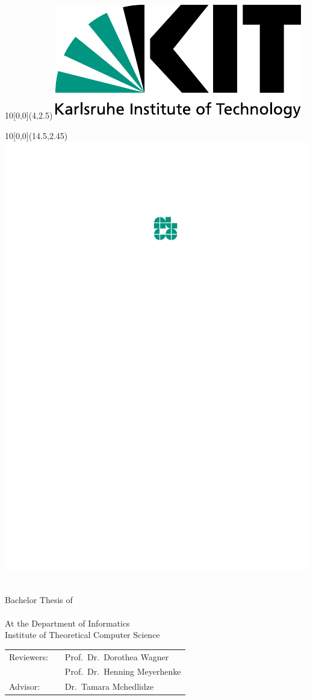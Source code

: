 \makeatletter
\begin{titlepage}


\begin{textblock}{10}[0,0](4,2.5)
\includegraphics[width=.3\textwidth]{Resources/Logos/KIT.pdf}
\end{textblock}

\begin{textblock}{10}[0,0](14.5,2.45)
\includegraphics[width=.15\textwidth]{Resources/Logos/Algo.pdf}
\end{textblock}


\vspace*{3.75cm}

\begin{center}
  \Huge{\@title}
  \vspace*{2.25cm}\\
  \Large{Bachelor Thesis of}\\
  \vspace*{1cm}
  \huge{\@author}\\
  \vspace*{1cm}
  \Large{At the Department of Informatics}\\
  \Large{Institute of Theoretical Computer Science}\\
\end{center}

\vspace*{1cm}

\begin{center}
\begin{Large}
\begin{tabular}[ht]{l c l}
  Reviewers: & \hfill & Prof.~Dr.~Dorothea Wagner\\
  & \hfill & Prof.~Dr.~Henning Meyerhenke\\
  Advisor: & \hfill & Dr.~Tamara Mchedlidze
\end{tabular}
\end{Large}
\end{center}


\end{titlepage}
